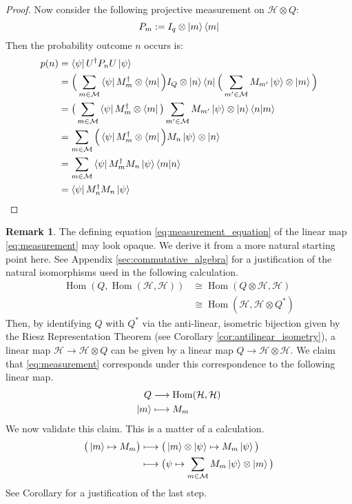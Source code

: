 \documentclass[12pt]{article}
\theoremstyle{plain}
\theoremstyle{definition}
\newtheorem{remark}[thm]{Remark}
\newcommand{\call}[1]{\mathcal{#1}}
\newcommand{\lto}{\longrightarrow}
\begin{document}
\begin{proof}
		Now consider the following projective measurement on $\call{H} \otimes Q$:
		\begin{equation}
			P_m := I_q \otimes \ket{m}\bra{m}
		\end{equation}
		Then the probability outcome $n$ occurs is:
		\begin{align*}
			p(n) &= \bra{\psi}U^\dagger P_n U \ket{\psi}\\
			&= \Big(\sum_{m \in \call{M}}\bra{\psi}M_m^\dagger \otimes \bra{m}\Big) I_Q \otimes \ket{n}\bra{n}\Big(\sum_{m' \in \call{M}}M_{m'}\ket{\psi}\otimes\ket{m}\Big)\\
			&= \big(\sum_{m \in \call{M}}\bra{\psi}M_m^\dagger \otimes \bra{m}\big)\sum_{m'\in\call{M}}M_{m'}\ket{\psi}\otimes\ket{n}\bra{n}\ket{m}\\
			&=\sum_{m \in \call{M}}\Big(\bra{\psi}M_m^\dagger \otimes \bra{m}\Big) M_n \ket{\psi}\otimes \ket{n}\\
			&=\sum_{m \in \call{M}}\bra{\psi}M_m^\dagger M_n\ket{\psi}\bra{m}\ket{n}\\
			&=\bra{\psi}M_n^\dagger M_n \ket{\psi}
		\end{align*}
	\end{proof}
	\begin{remark}
		The defining equation \eqref{eq:measurement_equation} of the linear map \eqref{eq:measurement} may look opaque. We derive it from a more natural starting point here. See Appendix \ref{sec:commutative_algebra} for a justification of the natural isomorphisms used in the following calculation.
		\begin{align}
			\operatorname{Hom}(Q, \operatorname{Hom}(\call{H}, \call{H})) &\cong \operatorname{Hom}(Q \otimes \call{H}, \call{H})\\
			&\cong\operatorname{Hom}(\call{H}, \call{H} \otimes Q^\ast)
		\end{align}
		Then, by identifying $Q$ with $Q^\ast$ via the anti-linear, isometric bijection given by the Riesz Representation Theorem (see Corollary \ref{cor:antilinear_isometry}), a linear map $\call{H} \lto \call{H} \otimes Q$ can be given by a linear map $Q \lto \call{H} \otimes \call{H}$. We claim that \eqref{eq:measurement} corresponds under this correspondence to the following linear map.
		\begin{align}
			Q &\lto \operatorname{Hom}(\call{H}, \call{H})\\
			\ket{m} &\longmapsto M_m
		\end{align}
		We now validate this claim. This is a matter of a calculation.
		\begin{align}
			\big(\ket{m} \mapsto M_m\big) &\longmapsto \big(\ket{m} \otimes \ket{\psi} \mapsto M_m\ket{\psi}\big)\\
			& \longmapsto \big(\psi \mapsto \sum_{m \in \call{M}} M_m\ket{\psi} \otimes \ket{m}\big)
		\end{align}
		See Corollary \cite[1.2.6]{CommutativeAlgebra} for a justification of the last step.
	\end{remark}
	
\end{document}
